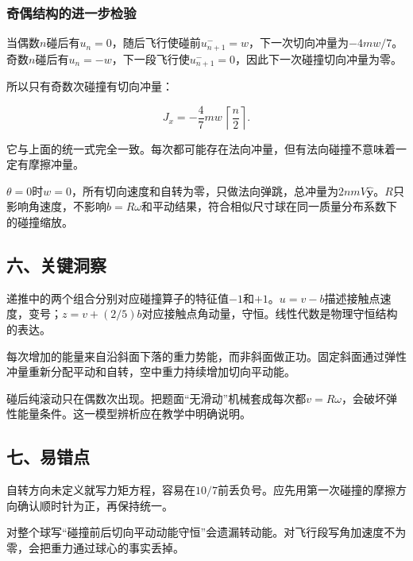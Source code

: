 \documentclass[12pt,a4paper,fontset=fandol]{ctexart}
\begin{document}
\par\noindent\begin{minipage}{\linewidth}
\subsubsection{奇偶结构的进一步检验}\label{ux5947ux5076ux7ed3ux6784ux7684ux8fdbux4e00ux6b65ux68c0ux9a8c}

当偶数\(n\)碰后有\(u_n=0\)，随后飞行使碰前\(u^-_{n+1}=w\)，下一次切向冲量为\(-4mw/7\)。奇数\(n\)碰后有\(u_n=-w\)，下一段飞行使\(u^-_{n+1}=0\)，因此下一次碰撞切向冲量为零。

所以只有奇数次碰撞有切向冲量：

\[
J_x=-\frac47mw\,\left\lceil\frac n2\right\rceil.
\]

它与上面的统一式完全一致。每次都可能存在法向冲量，但有法向碰撞不意味着一定有摩擦冲量。

\(\theta=0\)时\(w=0\)，所有切向速度和自转为零，只做法向弹跳，总冲量为\(2nmV\hat{\boldsymbol y}\)。\(R\)只影响角速度，不影响\(b=R\omega\)和平动结果，符合相似尺寸球在同一质量分布系数下的碰撞缩放。

\end{minipage}\par
\subsection{六、关键洞察}\label{ux516dux5173ux952eux6d1eux5bdf-2}

递推中的两个组合分别对应碰撞算子的特征值\(-1\)和\(+1\)。\(u=v-b\)描述接触点速度，变号；\(z=v+(2/5)b\)对应接触点角动量，守恒。线性代数是物理守恒结构的表达。

每次增加的能量来自沿斜面下落的重力势能，而非斜面做正功。固定斜面通过弹性冲量重新分配平动和自转，空中重力持续增加切向平动能。

碰后纯滚动只在偶数次出现。把题面``无滑动''机械套成每次都\(v=R\omega\)，会破坏弹性能量条件。这一模型辨析应在教学中明确说明。

\subsection{七、易错点}\label{ux4e03ux6613ux9519ux70b9-2}

自转方向未定义就写力矩方程，容易在\(10/7\)前丢负号。应先用第一次碰撞的摩擦方向确认顺时针为正，再保持统一。

对整个球写``碰撞前后切向平动动能守恒''会遗漏转动能。对飞行段写角加速度不为零，会把重力通过球心的事实丢掉。
\end{document}
